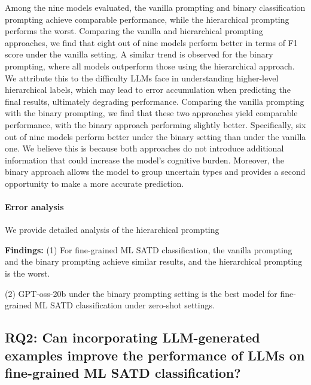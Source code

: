 \documentclass[acmsmall,screen,review,anonymous]{acmart}
\begin{document}
Among the nine models evaluated, the vanilla prompting and binary classification prompting achieve comparable performance, while the hierarchical prompting performs the worst. Comparing the vanilla and hierarchical prompting approaches, we find that eight out of nine models perform better in terms of F1 score under the vanilla setting. A similar trend is observed for the binary prompting, where all models outperform those using the hierarchical approach. We attribute this to the difficulty LLMs face in understanding higher-level hierarchical labels, which may lead to error accumulation when predicting the final results, ultimately degrading performance. Comparing the vanilla prompting with the binary prompting, we find that these two approaches yield comparable performance, with the binary approach performing slightly better. Specifically, six out of nine models perform better under the binary setting than under the vanilla one. We believe this is because both approaches do not introduce additional information that could increase the model’s cognitive burden. Moreover, the binary approach allows the model to group uncertain types and provides a second opportunity to make a more accurate prediction.


\paragraph{Error analysis} We provide detailed analysis of the hierarchical prompting 







\begin{boxB}
\textbf{Findings:} (1) For fine-grained ML SATD classification, the vanilla prompting and the binary prompting achieve similar results, and the hierarchical prompting is the worst. 

(2) GPT-oss-20b under the binary prompting setting is the best model for fine-grained ML SATD classification under zero-shot settings.


\end{boxB}


\subsection{RQ2: Can incorporating LLM-generated examples improve the performance of LLMs on fine-grained ML SATD classification?}
\end{document}
